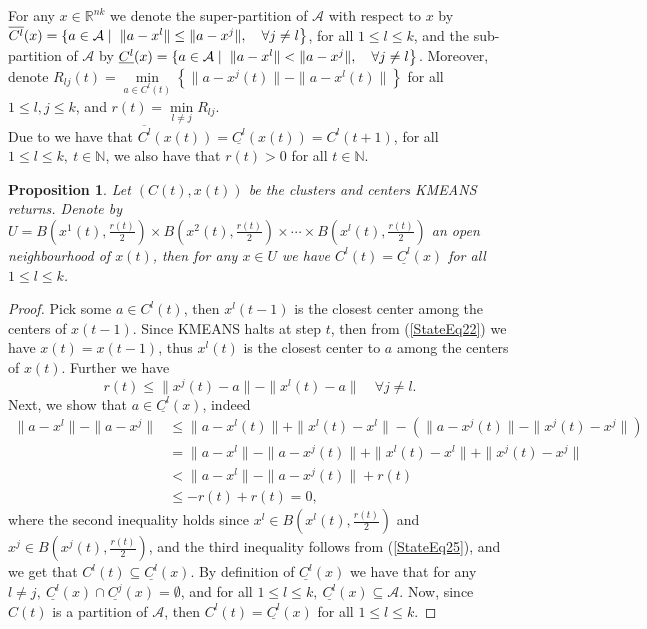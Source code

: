 \documentclass[12pt]{article}
\numberwithin{equation}{section}
\newtheorem{proposition}{Proposition}[section]
\begin{document}
For any $x \in \mathbb{R}^{nk}$ we denote the super-partition of $\mathcal{A}$ with respect to $x$ by $\overline{C^l}(x) = \left\lbrace a \in \mathcal{A} \mid \right. \\ \left. \|a - x^l\| \leq \|a - x^j\| , \quad \forall j \neq l \right\rbrace$, for all $1 \leq l \leq k$, and the sub-partition of $\mathcal{A}$ by $\underline{C^l}(x) = \left\lbrace a \in \mathcal{A} \mid \right. \\ \left. \|a - x^l\| < \|a - x^j\|, \quad \forall j \neq l \right\rbrace$.
Moreover, denote $R_{lj}(t) = \min\limits_{a \in C^l(t)} \left\lbrace \|a - x^j(t)\| - \|a - x^l(t)\| \right\rbrace$ for all $1 \leq l,j \leq k$, and $r(t) = \min\limits_{l \neq j} R_{lj}$. \\
Due to  we have that $\overline{C^l}(x(t)) = \underline{C^l}(x(t)) = C^l(t+1)$, for all $1 \leq l \leq k, \: t \in \mathbb{N}$, we also have that $r(t) > 0$ for all $t \in \mathbb{N}$.

\begin{proposition} \label{StateEq24}
Let $(C(t), x(t))$ be the clusters and centers KMEANS returns. Denote by $U = B\left( x^1(t),\frac{r(t)}{2}\right) \times  B\left( x^2(t),\frac{r(t)}{2}\right) \times \cdots \times B\left( x^l(t),\frac{r(t)}{2} \right)$ an open neighbourhood of $x(t)$, then for any $x \in U$ we have $C^l(t) = \underline{C^l}(x)$ for all $1 \leq l \leq k$.
\end{proposition}

\begin{proof}
Pick some $a \in C^l(t)$, then $x^l(t-1)$ is the closest center among the centers of $x(t-1)$. Since KMEANS halts at step $t$, then from (\ref{StateEq22}) we have $x(t)=x(t-1)$, thus $x^l(t)$ is the closest center to $a$ among the centers of $x(t)$. Further we have
\begin{equation}
	r(t) \leq \|x^j(t) - a\| - \|x^l(t) -a\| \quad \forall j \neq l . \label{StateEq25}
\end{equation}
Next, we show that $a \in \underline{C^l}(x)$, indeed
\begin{align*}
	\|a - x^l\| -  \|a - x^j\| &\leq \|a - x^l(t)\| + \|x^l(t) - x^l\| - \left( \|a - x^j(t)\| - \|x^j(t) - x^j\| \right) \\
	& = \|a - x^l\| - \|a - x^j(t)\| + \|x^l(t) - x^l\| + \|x^j(t) - x^j\| \\
	& < \|a - x^l\| - \|a - x^j(t)\| + r(t) \\
	& \leq -r(t) + r(t) = 0 ,
\end{align*}
where the second inequality holds since $x^l \in B\left( x^l(t), \frac{r(t)}{2} \right)$ and $x^j \in B\left( x^j(t), \frac{r(t)}{2} \right)$, and the third inequality follows from (\ref{StateEq25}), and we get that $C^l(t) \subseteq \underline{C^l}(x)$. 
By definition of $\underline{C^l}(x)$ we have that for any $l \neq j, \: \underline{C^l}(x) \cap \underline{C^j}(x)=\emptyset$, and for all $1 \leq l \leq k, \: \underline{C^l}(x) \subseteq \mathcal{A}$. Now, since $C(t)$ is a partition of $\mathcal{A}$, then $C^l(t) = \underline{C^l}(x)$ for all $1 \leq l \leq k$.
\end{proof}
\end{document}
